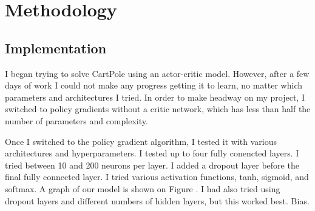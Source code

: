 \documentclass[12pt,a4paper]{article}
\begin{document}
\section{Methodology}
%


\subsection*{Implementation}

I began trying to solve CartPole using an actor-critic model. However, after a few days of work I could not make any progress getting it to learn, no matter which parameters and architectures I tried. In order to make headway on my project, I switched to policy gradients without a critic network, which has less than half the number of parameters and complexity.

Once I switched to the policy gradient algorithm, I tested it with various architectures and hyperparameters. I tested up to four fully conencted layers. I tried between 10 and 200 neurons per layer. I added a dropout layer before the final fully connected layer. I tried various activation functions, tanh, sigmoid, and softmax. A graph of our model is shown on Figure \label{actor_net}. I had also tried using dropout layers and different numbers of hidden layers, but this worked best. Bias.  
\end{document}
